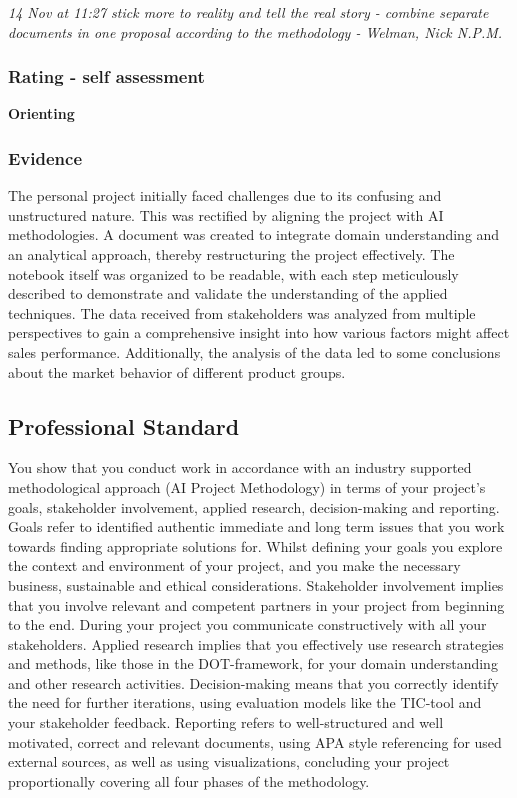 \documentclass[a4paper, 11pt]{article}
\begin{document}
\begin{mdframed}[backgroundcolor=gray!20, linecolor=black, linewidth=0pt, leftmargin=1cm, rightmargin=1cm, innertopmargin=10pt, innerbottommargin=10pt]
  \itshape
  14 Nov at 11:27 \smallbreak
  stick more to reality and tell the real story - combine separate documents in one proposal according to the methodology\smallbreak
- Welman, Nick N.P.M.
\end{mdframed}


\subsubsection{Rating - self assessment}
\textbf{Orienting} 
\subsubsection{Evidence}

The personal project initially faced challenges due to its confusing and unstructured nature. This was rectified by aligning the project with AI methodologies. A document was created to integrate domain understanding and an analytical approach, thereby restructuring the project effectively. The notebook itself was organized to be readable, with each step meticulously described to demonstrate and validate the understanding of the applied techniques. The data received from stakeholders was analyzed from multiple perspectives to gain a comprehensive insight into how various factors might affect sales performance. Additionally, the analysis of the data led to some conclusions about the market behavior of different product groups.

\subsection{Professional Standard}
You show that you conduct work in accordance with an industry supported methodological approach (AI Project Methodology) in terms of your project's goals, stakeholder involvement, applied research, decision-making and reporting.
\medbreak
Goals refer to identified authentic immediate and long term issues that you work towards finding appropriate solutions for. Whilst defining your goals you explore the context and environment of your project, and you make the necessary business, sustainable and ethical considerations. Stakeholder involvement implies that you involve relevant and competent partners in your project from beginning to the end. During your project you communicate constructively with all your stakeholders. Applied research implies that you effectively use research strategies and methods, like those in the DOT-framework, for your domain understanding and other research activities. Decision-making means that you correctly identify the need for further iterations, using evaluation models like the TIC-tool and your stakeholder feedback. Reporting refers to well-structured and well motivated, correct and relevant documents, using APA style referencing for used external sources, as well as using visualizations, concluding your project proportionally covering all four phases of the methodology.  
\end{document}

